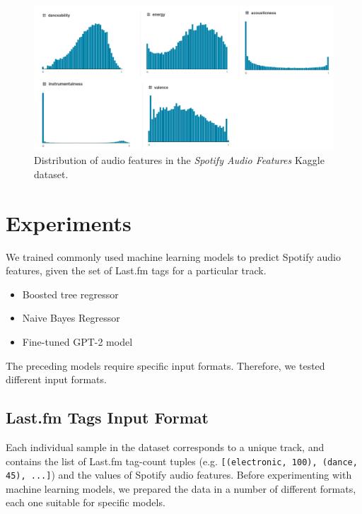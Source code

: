 \documentclass[sn-mathphys]{sn-jnl}%
\theoremstyle{thmstyleone}%
\theoremstyle{thmstyletwo}%
\theoremstyle{thmstylethree}%
\begin{document}
\begin{figure}[h!]
      \centering
      \includegraphics[width=\textwidth]{images/feature-distribution-kaggle.png}
      \caption{Distribution of audio features in the \emph{Spotify Audio Features} Kaggle dataset.}
      \label{fig:audio-features-distribution-kaggle}
\end{figure}




\section{Experiments}

We trained commonly used machine learning models to predict Spotify audio features, given the set of Last.fm tags for a particular track.

\begin{itemize}
      \item Boosted tree regressor \cite{xgboost}
      \item Naive Bayes Regressor \cite{bayesian}
      \item Fine-tuned GPT-2 model
\end{itemize}

The preceding models require specific input formats.
Therefore, we tested different input formats.

\subsection{Last.fm Tags Input Format}

Each individual sample in the dataset corresponds to a unique track,
and contains the list of Last.fm tag-count tuples (e.g. \verb|[(electronic, 100), (dance, 45), ...]|)
and the values of Spotify audio features.
Before experimenting with machine learning models, we prepared the data in a number of different formats,
each one suitable for specific models.
\end{document}
